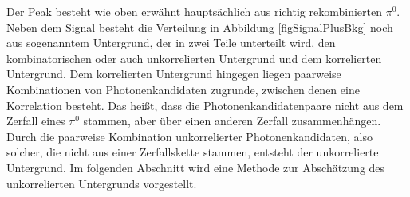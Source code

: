 Der Peak besteht wie oben erwähnt hauptsächlich aus richtig rekombinierten $\pi^{0}$.
Neben dem Signal besteht die Verteilung in Abbildung \ref{figSignalPlusBkg} noch aus sogenanntem Untergrund, der in zwei Teile unterteilt wird, den kombinatorischen oder auch unkorrelierten Untergrund und dem korrelierten Untergrund.
Dem korrelierten Untergrund hingegen liegen paarweise Kombinationen von Photonenkandidaten zugrunde, zwischen denen eine Korrelation besteht.
Das heißt, dass die Photonenkandidatenpaare nicht aus dem Zerfall eines $\pi^{0}$ stammen, aber über einen anderen Zerfall zusammenhängen.
Durch die paarweise Kombination unkorrelierter Photonenkandidaten, also solcher, die nicht aus einer Zerfallskette stammen, entsteht der unkorrelierte Untergrund.
\newline
Im folgenden Abschnitt wird eine Methode zur Abschätzung des unkorrelierten Untergrunds vorgestellt. 